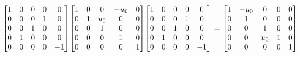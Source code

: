 \documentclass[11pt]{article}
\theoremstyle{definition}
\begin{document}
\[
\scaletoalign{\textwidth}{{\left[\begin{matrix}1 & 0 & 0 & 0 & 0\\0 & 0 & 0 & 1 & 0\\0 & 0 & 1 & 0 & 0\\0 & 1 & 0 & 0 & 0\\0 & 0 & 0 & 0 & -1\end{matrix}\right]} {\left[\begin{matrix}1 & 0 & 0 & - u_{0} & 0\\0 & 1 & u_{0} & 0 & 0\\0 & 0 & 1 & 0 & 0\\0 & 0 & 0 & 1 & 0\\0 & 0 & 0 & 0 & 1\end{matrix}\right]} {\left[\begin{matrix}1 & 0 & 0 & 0 & 0\\0 & 0 & 0 & 1 & 0\\0 & 0 & 1 & 0 & 0\\0 & 1 & 0 & 0 & 0\\0 & 0 & 0 & 0 & -1\end{matrix}\right]} = {\left[\begin{matrix}1 & - u_{0} & 0 & 0 & 0\\0 & 1 & 0 & 0 & 0\\0 & 0 & 1 & 0 & 0\\0 & 0 & u_{0} & 1 & 0\\0 & 0 & 0 & 0 & 1\end{matrix}\right]}}
\]
\end{document}
